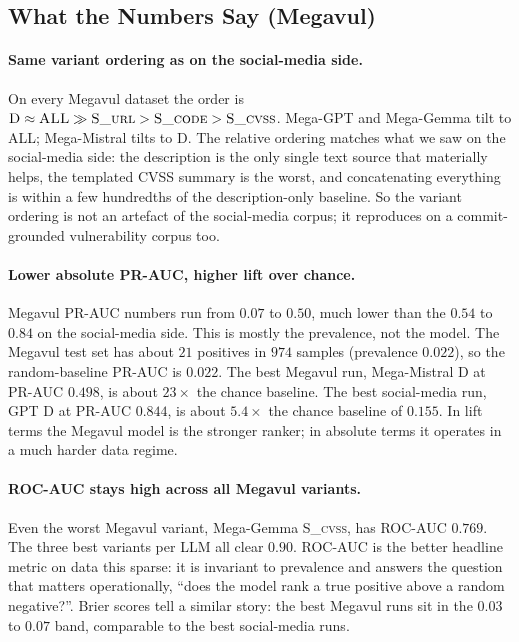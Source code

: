 \documentclass[11pt]{article}
\begin{document}
\subsection{What the Numbers Say (Megavul)}

\paragraph{Same variant ordering as on the social-media side.}
On every Megavul dataset the order is
$\textsc{D} \approx \textsc{ALL} \gg \textsc{S\_url} > \textsc{S\_code} > \textsc{S\_cvss}$.
Mega-GPT and Mega-Gemma tilt to \textsc{ALL}; Mega-Mistral tilts to
\textsc{D}. The relative ordering matches what we saw on the
social-media side: the description is the only single text source
that materially helps, the templated CVSS summary is the worst, and
concatenating everything is within a few hundredths of the
description-only baseline. So the variant ordering is not an artefact
of the social-media corpus; it reproduces on a commit-grounded
vulnerability corpus too.

\paragraph{Lower absolute PR-AUC, higher lift over chance.}
Megavul PR-AUC numbers run from $0.07$ to $0.50$, much lower than the
$0.54$ to $0.84$ on the social-media side. This is mostly the
prevalence, not the model. The Megavul test set has about $21$
positives in $974$ samples (prevalence $0.022$), so the random-baseline
PR-AUC is $0.022$. The best Megavul run, Mega-Mistral \textsc{D} at
PR-AUC $0.498$, is about $23\times$ the chance baseline. The best
social-media run, GPT \textsc{D} at PR-AUC $0.844$, is about $5.4\times$
the chance baseline of $0.155$. In lift terms the Megavul model is
the stronger ranker; in absolute terms it operates in a much harder
data regime.

\paragraph{ROC-AUC stays high across all Megavul variants.}
Even the worst Megavul variant, Mega-Gemma \textsc{S\_cvss}, has
ROC-AUC $0.769$. The three best variants per LLM all clear $0.90$.
ROC-AUC is the better headline metric on data this sparse: it is
invariant to prevalence and answers the question that matters
operationally, ``does the model rank a true positive above a random
negative?''. Brier scores tell a similar story: the best Megavul
runs sit in the $0.03$ to $0.07$ band, comparable to the best
social-media runs.
\end{document}
